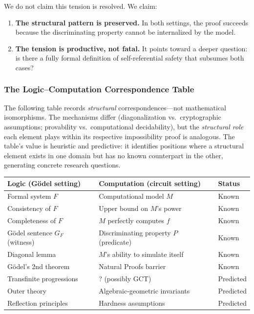 \documentclass[11pt,a4paper]{article}
\theoremstyle{plain}
\theoremstyle{definition}
\theoremstyle{remark}
\begin{document}
We do not claim this tension is resolved. We claim:
\begin{enumerate}
\item \textbf{The structural pattern is preserved.} In both settings, the proof succeeds because the discriminating property cannot be internalized by the model.
\item \textbf{The tension is productive, not fatal.} It points toward a deeper question: is there a fully formal definition of self-referential safety that subsumes both cases?
\end{enumerate}

\subsubsection{The Logic--Computation Correspondence Table}

The following table records \emph{structural} correspondences---not mathematical isomorphisms. The mechanisms differ (diagonalization vs.\ cryptographic assumptions; provability vs.\ computational decidability), but the \emph{structural role} each element plays within its respective impossibility proof is analogous. The table's value is heuristic and predictive: it identifies positions where a structural element exists in one domain but has no known counterpart in the other, generating concrete research questions.

\begin{table}[h]
\centering
\small
\begin{tabular}{@{}lll@{}}
\toprule
Logic (G\"{o}del setting) & Computation (circuit setting) & Status \\
\midrule
Formal system $F$ & Computational model $M$ & Known \\
Consistency of $F$ & Upper bound on $M$'s power & Known \\
Completeness of $F$ & $M$ perfectly computes $f$ & Known \\
G\"{o}del sentence $G_F$ (witness) & Discriminating property $P$ (predicate) & Known \\
Diagonal lemma & $M$'s ability to simulate itself & Known \\
G\"{o}del's 2nd theorem & Natural Proofs barrier & Known \\
Transfinite progressions & ? (possibly GCT) & Predicted \\
Outer theory & Algebraic-geometric invariants & Predicted \\
Reflection principles & Hardness assumptions & Predicted \\
\bottomrule
\end{tabular}
\end{table}
\end{document}
